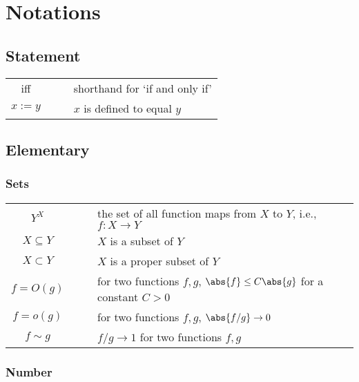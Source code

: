 \chapter{Notations}

\section{Statement}

\begin{center}
\begin{longtable}{ccl}
\hline
iff & $\quad$ & shorthand for `if and only if'\\
$x:=y$ & & $x$ is defined to equal $y$\\
\hline
\end{longtable}
\end{center}

\section{Elementary}

\subsection{Sets}

\begin{center}
\begin{longtable}{ccl}
\hline
$Y^X$ & $\quad$ & the set of all function maps from $X$ to $Y$, i.e., $f:X\to Y$\\
$X\subseteq Y$ & & $X$ is a subset of $Y$ \\
$X\subset Y$ & & $X$ is a proper subset of $Y$\\
$f= O(g)$ & & for two functions $f,g$, $\abs{f}\leq C\abs{g}$ for a constant $C>0$ \\
$f= o(g)$ & & for two functions $f,g$, $\abs{f/g}\to 0$ \\
$f\sim g$ & & $f/g \to 1$ for two functions $f,g$\\
\hline
\end{longtable}
\end{center}

\subsection{Number}

